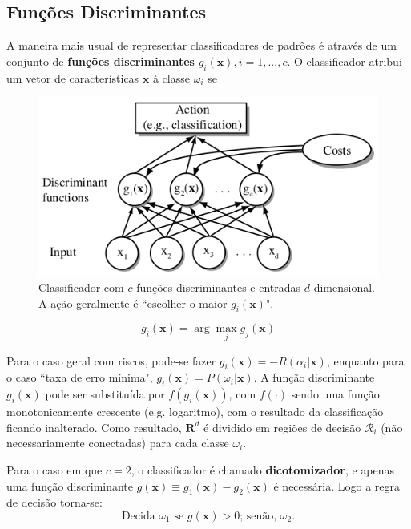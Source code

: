 \documentclass[a4paper,12pt,twocolumn]{article}
\begin{document}
\subsection{Funções Discriminantes}

A maneira mais usual de representar classificadores de padrões é através de um conjunto de \textbf{funções discriminantes} $g_i(\boldsymbol{x}), i = 1, ..., c$. O classificador atribui um vetor de características $\boldsymbol{x}$ à classe $\omega_i$ se

\begin{figure}[ht]
    \centering
    \includegraphics[width=\columnwidth]{discriminant_functions}
    \caption{Classificador com $c$ funções discriminantes e entradas $d$-dimensional. A ação geralmente é ``escolher o maior $g_i(\boldsymbol{x})$".}
    \label{fig:discriminant_functions}
\end{figure}

\begin{equation}
    g_i(\boldsymbol{x}) = \arg\max_j g_j(\boldsymbol{x})
    \label{eq:discriminant_functions}
\end{equation}

Para o caso geral com riscos, pode-se fazer $g_i(\boldsymbol{x}) = - R(\alpha_i|\boldsymbol{x})$, enquanto para o caso ``taxa de erro mínima", $g_i(\boldsymbol{x}) = P(\omega_i|\boldsymbol{x})$. A função discriminante $g_i(\boldsymbol{x})$ pode ser substituída por $f(g_i(\boldsymbol{x}))$, com $f(\cdot)$ sendo uma função monotonicamente crescente (e.g. logaritmo), com o resultado da classificação ficando inalterado. Como resultado, $\boldsymbol{R}^d$ é dividido em regiões de decisão $\mathcal{R}_i$ (não necessariamente conectadas) para cada classe $\omega_i$.

Para o caso em que $c = 2$, o classificador é chamado \textbf{dicotomizador}, e apenas uma função discriminante $g(\boldsymbol{x}) \equiv g_1(\boldsymbol{x}) - g_2(\boldsymbol{x})$ é necessária. Logo a regra de decisão torna-se:
\begin{equation}
    \text{Decida } \omega_1 \text{ se } g(\boldsymbol{x}) > 0 \text {; senão, } \omega_2.
    \label{eq:decision_6}
\end{equation}
\end{document}

